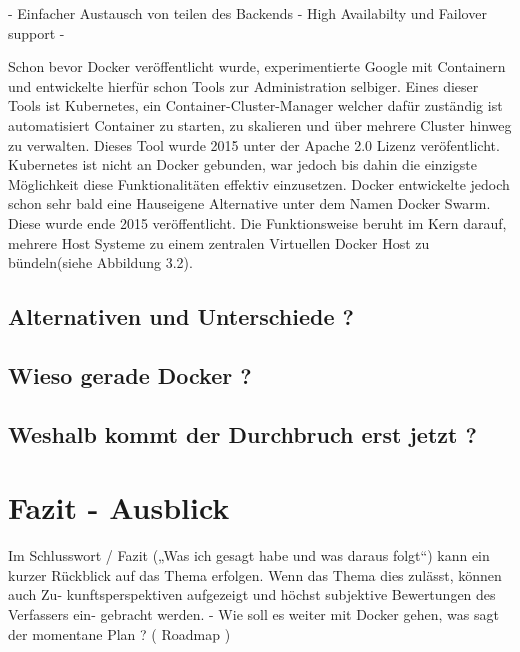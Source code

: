 \documentclass[12pt,toc=bib,toc=listof]{scrreprt}
\begin{document}
- Einfacher Austausch von teilen des Backends
- High Availabilty und Failover support
- 




Schon bevor Docker veröffentlicht wurde, experimentierte Google mit Containern und entwickelte hierfür schon Tools zur Administration selbiger.
Eines dieser Tools ist Kubernetes, ein Container-Cluster-Manager welcher dafür zuständig ist automatisiert Container zu starten, zu skalieren und über mehrere Cluster hinweg zu verwalten.
Dieses Tool wurde 2015 unter der Apache 2.0 Lizenz veröfentlicht.
Kubernetes ist nicht an Docker gebunden, war jedoch bis dahin die einzigste Möglichkeit diese Funktionalitäten effektiv einzusetzen.
Docker entwickelte jedoch schon sehr bald eine Hauseigene Alternative unter dem Namen Docker Swarm.
Diese wurde ende 2015 veröffentlicht.
Die Funktionsweise beruht im Kern darauf, mehrere Host Systeme zu einem zentralen Virtuellen Docker Host zu bündeln(siehe Abbildung 3.2).






\section{Alternativen und Unterschiede ?}

\section{Wieso gerade Docker ?}

\section{Weshalb kommt der Durchbruch erst jetzt ?}

\chapter{Fazit - Ausblick} %
\label{sec:fazit}
Im Schlusswort / Fazit („Was ich gesagt habe und was daraus folgt“) kann ein kurzer
Rückblick auf das Thema erfolgen. Wenn das Thema dies zulässt, können auch Zu-
kunftsperspektiven aufgezeigt und höchst subjektive Bewertungen des Verfassers ein-
gebracht werden.
- Wie soll es weiter mit Docker gehen, was sagt der momentane Plan ? ( Roadmap )

\end{document}
